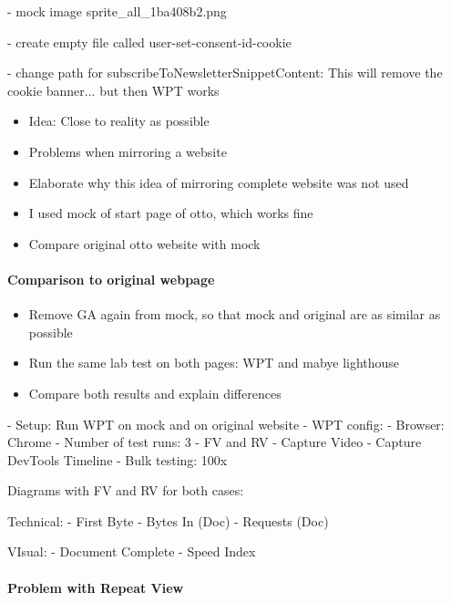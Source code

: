 - mock image sprite\_all\_1ba408b2.png

- create empty file called user-set-consent-id-cookie

- change path for subscribeToNewsletterSnippetContent: This will remove the cookie banner... but then WPT works



\begin{itemize}
    \item Idea: Close to reality as possible
    \item Problems when mirroring a website
    \item Elaborate why this idea of mirroring complete website was not used
    \item I used mock of start page of otto, which works fine
    \item Compare original otto website with mock
\end{itemize}





\paragraph{Comparison to original webpage}

\begin{itemize}
    \item Remove GA again from mock, so that mock and original are as similar as possible
    \item Run the same lab test on both pages: WPT and mabye lighthouse
    \item Compare both results and explain differences
\end{itemize}



- Setup: Run WPT on mock and on original website
- WPT config:
- Browser: Chrome
- Number of test runs: 3
- FV and RV
- Capture Video
- Capture DevTools Timeline
- Bulk testing: 100x



Diagrams with FV and RV for both cases:

Technical:
- First Byte
- Bytes In (Doc)
- Requests (Doc)

VIsual:
- Document Complete
- Speed Index

\paragraph{Problem with Repeat View}

